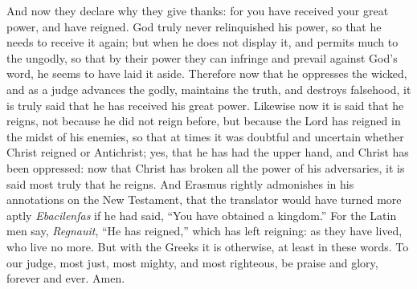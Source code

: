 And now they declare why they give thanks: for you have received your great power, and have reigned. God truly never relinquished his power, so that he needs to receive it again; but when he does not display it, and permits much to the ungodly, so that by their power they can infringe and prevail against God’s word, he seems to have laid it aside. Therefore now that he oppresses the wicked, and as a judge advances the godly, maintains the truth, and destroys falsehood, it is truly said that he has received his great power. Likewise now it is said that he reigns, not because he did not reign before, but because the Lord has reigned in the midst of his enemies, so that at times it was doubtful and uncertain whether Christ reigned or Antichrist; yes, that he has had the upper hand, and Christ has been oppressed: now that Christ has broken all the power of his adversaries, it is said most truly that he reigns. And Erasmus rightly admonishes in his annotations on the New Testament, that the translator would have turned more aptly \textit{Ebacilenſas} if he had said, “You have obtained a kingdom.” For the Latin men say, \textit{Regnauit}, “He has reigned,” which has left reigning: as they have lived, who live no more. But with the Greeks it is otherwise, at least in these words. To our judge, most just, most mighty, and most righteous, be praise and glory, forever and ever. Amen.
